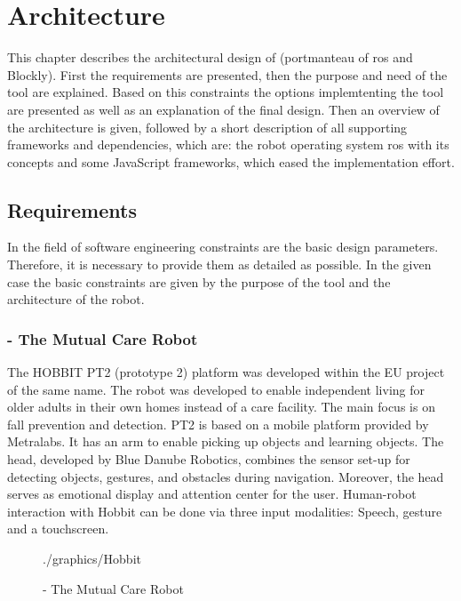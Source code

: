 \chapter{Architecture}
This chapter describes the architectural design of \toolname{} (portmanteau of \gls{ros} and Blockly). First the requirements are presented, then the purpose and need of the tool are explained. Based on this constraints the options implemtenting the tool are presented as well as an explanation of the final design. Then an overview of the architecture is given, followed by a short description of all supporting frameworks and dependencies, which are: the robot operating system \gls{ros} with its concepts and some JavaScript frameworks, which eased the implementation effort.

\section{Requirements} \label{sec:requirements}
In the field of software engineering constraints are the basic design parameters. Therefore, it is necessary to provide them as detailed as possible. In the given case the basic constraints are given by the purpose of the tool and the architecture of the robot.

\subsection{\hobbit{} - The Mutual Care Robot}
The HOBBIT PT2 (prototype 2) platform was developed within the EU project of the same name. The robot was developed to enable independent living for older adults in their own homes instead of a care facility. The main focus is on fall prevention and detection. PT2 is based on a mobile platform provided by Metralabs. It has an arm to enable picking up objects and learning objects. The head, developed by Blue Danube Robotics, combines the sensor set-up for detecting objects, gestures, and obstacles during navigation. Moreover, the head serves as emotional display and attention center for the user. Human-robot interaction with Hobbit can be done via three input modalities: Speech, gesture and a touchscreen. \cite{HobbitACIN}\\

\begin{figure}[htbp]
	\centering
	\begin{overpic}[width=0.3\linewidth]{./graphics/Hobbit}
	\end{overpic}
	\caption{\hobbit{} - The Mutual Care Robot}%
	\label{fig:HobbitPic}%
\end{figure}

